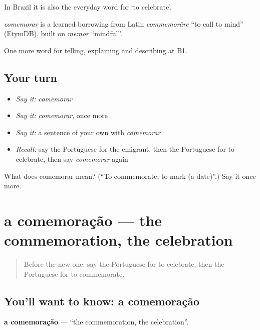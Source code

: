 In Brazil it is also the everyday word for ‘to celebrate’.

\begin{cousinweb}
\emph{comemorar} is a learned borrowing from Latin \emph{commemorāre} \textquotedblleft{}to call to mind\textquotedblright{} (EtymDB), built on \emph{memor} \textquotedblleft{}mindful\textquotedblright{}.
\end{cousinweb}

\begin{grammarlens}[title={What you've built}]
One more word for telling, explaining and describing at B1.
\end{grammarlens}

\subsection*{Your turn}
\begin{itemize}
\raggedright
  \item \emph{Say it:} \emph{comemorar}
  \item \emph{Say it:} \emph{comemorar}, once more
  \item \emph{Say it:} a sentence of your own with \emph{comemorar}
  \item \emph{Recall:} say the Portuguese for the emigrant, then the Portuguese for to celebrate, then say \emph{comemorar} again
\end{itemize}

\begin{tcolorbox}[breakable,colback=teal!4,colframe=teal!35!black,title={Before you move on}]
What does comemorar mean? (\textquotedblleft{}To commemorate, to mark (a date)\textquotedblright{}.) Say it once more.
\end{tcolorbox}
\section[a comemoração]{a comemoração — the commemoration, the celebration}

\label{lesson:PT-C318-comemoracao}



\begin{quote}
Before the new one: say the Portuguese for to celebrate, then the Portuguese for to commemorate.
\end{quote}

\subsection*{You'll want to know: a comemoração}
\textbf{a comemoração} — \textquotedblleft{}the commemoration, the celebration\textquotedblright{}.

